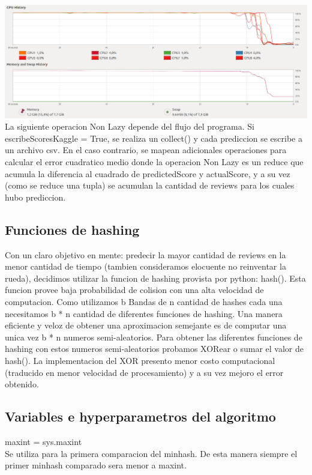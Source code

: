 \documentclass[a4paper,10pt]{article}
\begin{document}
\includegraphics[width=\textwidth]{timeline3} \\ La siguiente operacion Non Lazy depende del flujo del programa. Si escribeScoresKaggle = True, se realiza un collect() y cada prediccion se escribe a un archivo csv. En el caso contrario, se mapean adicionales operaciones para calcular el error cuadratico medio donde la operacion Non Lazy es un reduce que acumula la diferencia al cuadrado de predictedScore y actualScore, y a su vez (como se reduce una tupla) se acumulan la cantidad de reviews para los cuales hubo prediccion.



	\subsection{Funciones de hashing}

	Con un claro objetivo en mente: predecir la mayor cantidad de reviews en la menor cantidad de tiempo (tambien consideramos elocuente no reinventar la rueda), decidimos utilizar la funcion de hashing provista por python: hash(). Esta funcion provee baja probabilidad de colision con una alta velocidad de computacion. Como utilizamos b Bandas de n cantidad de hashes cada una necesitamos b * n cantidad de diferentes funciones de hashing. Una manera eficiente y veloz de obtener una aproximacion semejante es de computar una unica vez b * n numeros semi-aleatorios. Para obtener las diferentes funciones de hashing con estos numeros semi-aleatorios probamos XORear o sumar el valor de hash(). La implementacion del XOR presento menor costo computacional (traducido en menor velocidad de procesamiento) y a su vez mejoro el error obtenido.
	
		
	\subsection{Variables e hyperparametros del algoritmo}

	maxint = sys.maxint\\
	Se utiliza para la primera comparacion del minhash. De esta manera siempre el primer minhash comparado sera menor a maxint.\\ \\
\end{document}
